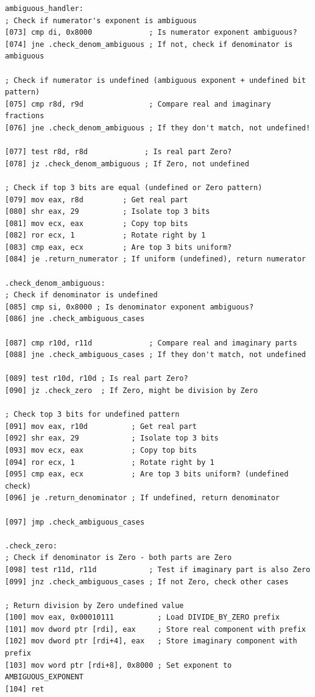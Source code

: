 \documentclass[12pt,letter]{article}
\begin{document}
\begin{lstlisting}[style=rust, caption={Complete Complex Division Assembly Implementation}, label={fig:circle_divide}]
ambiguous_handler:
; Check if numerator's exponent is ambiguous
[073] cmp di, 0x8000             ; Is numerator exponent ambiguous?
[074] jne .check_denom_ambiguous ; If not, check if denominator is ambiguous

; Check if numerator is undefined (ambiguous exponent + undefined bit pattern)
[075] cmp r8d, r9d               ; Compare real and imaginary fractions
[076] jne .check_denom_ambiguous ; If they don't match, not undefined!

[077] test r8d, r8d             ; Is real part Zero?
[078] jz .check_denom_ambiguous ; If Zero, not undefined

; Check if top 3 bits are equal (undefined or Zero pattern)
[079] mov eax, r8d         ; Get real part
[080] shr eax, 29          ; Isolate top 3 bits
[081] mov ecx, eax         ; Copy top bits
[082] ror ecx, 1           ; Rotate right by 1
[083] cmp eax, ecx         ; Are top 3 bits uniform?
[084] je .return_numerator ; If uniform (undefined), return numerator

.check_denom_ambiguous:
; Check if denominator is undefined
[085] cmp si, 0x8000 ; Is denominator exponent ambiguous?
[086] jne .check_ambiguous_cases

[087] cmp r10d, r11d             ; Compare real and imaginary parts
[088] jne .check_ambiguous_cases ; If they don't match, not undefined

[089] test r10d, r10d ; Is real part Zero?
[090] jz .check_zero  ; If Zero, might be division by Zero

; Check top 3 bits for undefined pattern
[091] mov eax, r10d          ; Get real part
[092] shr eax, 29            ; Isolate top 3 bits
[093] mov ecx, eax           ; Copy top bits
[094] ror ecx, 1             ; Rotate right by 1
[095] cmp eax, ecx           ; Are top 3 bits uniform? (undefined check)
[096] je .return_denominator ; If undefined, return denominator

[097] jmp .check_ambiguous_cases

.check_zero:
; Check if denominator is Zero - both parts are Zero
[098] test r11d, r11d            ; Test if imaginary part is also Zero
[099] jnz .check_ambiguous_cases ; If not Zero, check other cases

; Return division by Zero undefined value
[100] mov eax, 0x00010111          ; Load DIVIDE_BY_ZERO prefix
[101] mov dword ptr [rdi], eax     ; Store real component with prefix
[102] mov dword ptr [rdi+4], eax   ; Store imaginary component with prefix
[103] mov word ptr [rdi+8], 0x8000 ; Set exponent to AMBIGUOUS_EXPONENT
[104] ret


\end{lstlisting}
\end{document}
